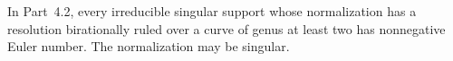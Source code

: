 
\begin{proposition}[P4R.7]\hypertarget{tag-02YJ}{}\label{night:P4R.7}\label{stmt:P4R.7}


In Part~4.2, every irreducible singular
support whose normalization has a
resolution birationally ruled over a
curve of genus at least two has
nonnegative Euler number. The
normalization may be singular.
\end{proposition}

